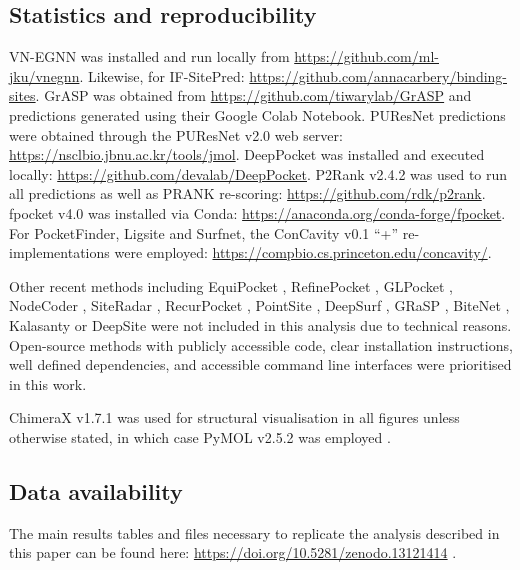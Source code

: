 \subsection{Statistics and reproducibility}

VN-EGNN was installed and run locally from \url{https://github.com/ml-jku/vnegnn}. Likewise, for IF-SitePred: \url{https://github.com/annacarbery/binding-sites}. GrASP was obtained from \url{https://github.com/tiwarylab/GrASP} and predictions generated using their Google Colab Notebook. PUResNet predictions were obtained through the PUResNet v2.0 web server: \url{https://nsclbio.jbnu.ac.kr/tools/jmol}. DeepPocket was installed and executed locally: \url{https://github.com/devalab/DeepPocket}. P2Rank v2.4.2 was used to run all predictions as well as PRANK re-scoring: \url{https://github.com/rdk/p2rank}. fpocket v4.0 was installed via Conda: \url{https://anaconda.org/conda-forge/fpocket}. For PocketFinder, Ligsite and Surfnet, the ConCavity v0.1 ``+'' re-implementations were employed: \url{https://compbio.cs.princeton.edu/concavity/}.

Other recent methods including  EquiPocket \cite{YAN_2024_EQUIPOCKET}, RefinePocket \cite{LIU_2023_REFINEPOCKET}, GLPocket \cite{LI_2023_GLPOCKET}, NodeCoder \cite{ABDOLLAHI_2023_NODECODER}, SiteRadar \cite{EVTEEV_2023_SITERADAR}, RecurPocket \cite{LI_2022_RECURPOCKET}, PointSite \cite{YAN_2022_POINTSITE}, DeepSurf \cite{MYOLNAS_2021_DEEPSURF}, GRaSP \cite{SANTANA_2020_GRaSP}, BiteNet \cite{KOZLOVSKII_2020_BITENET}, Kalasanty \cite{STEPNIEWSKA_2020_KALASANTY} or DeepSite \cite{JIMENEZ_2017_DEEPSITE} were not included in this analysis due to technical reasons. Open-source methods with publicly accessible code, clear installation instructions, well defined dependencies, and accessible command line interfaces were prioritised in this work.

ChimeraX v1.7.1 \cite{PETTERSEN_2021_CHIMERAX} was used for structural visualisation in all figures unless otherwise stated, in which case PyMOL v2.5.2 was employed \cite{SCHRODINGER_2015_PYMOL}.

\subsection{Data availability}

The main results tables and files necessary to replicate the analysis described in this paper can be found here: \url{https://doi.org/10.5281/zenodo.13121414} \cite{UTGES_2024_LBSCOMP_ZENODO}.

